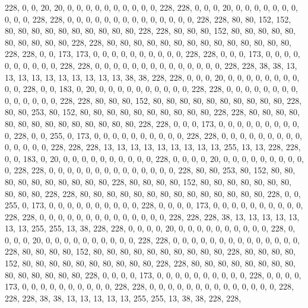 {	228, 0,   0,   20,  20,  0,   0,   0,   0,   0,   0,   0,   0,   0,   0,   228, 228, 0,   0,   0,   20,  0,   0,   0,   0,   0,   0,   0,   0,   0,   0,   228, 228, 0,   0,   0,   0,   0,   0,   0,   0,   0,   0,   0,   0,   0,   0,   228, 228, 80,  80,  152, 152, 80,  80,  80,  80,  80,  80,  80,  80,  80,  80,  228, 228, 80,  80,  80,  152, 80,  80,  80,  80,  80,  80,  80,  80,  80,  80,  228, 228, 80,  80,  80,  80,  80,  80,  80,  80,  80,  80,  80,  80,  80,  80,  228, 228, 0,   0,   173, 173, 0,   0,   0,   0,   0,   0,   0,   0,   0,   0,   228, 228, 0,   0,   0,   173, 0,   0,   0,   0,   0,   0,   0,   0,   0,   0,   228, 228, 0,   0,   0,   0,   0,   0,   0,   0,   0,   0,   0,   0,   0,   0,   228, 228, 38,  38,  13,  13,  13,  13,  13,  13,  13,  13,  13,  13,  38,  38,  228, 
	228, 0,   0,   0,   20,  0,   0,   0,   0,   0,   0,   0,   0,   0,   0,   228, 0,   0,   183, 0,   20,  0,   0,   0,   0,   0,   0,   0,   0,   0,   0,   228, 228, 0,   0,   0,   0,   0,   0,   0,   0,   0,   0,   0,   0,   0,   0,   228, 228, 80,  80,  80,  152, 80,  80,  80,  80,  80,  80,  80,  80,  80,  80,  228, 80,  80,  253, 80,  152, 80,  80,  80,  80,  80,  80,  80,  80,  80,  80,  228, 228, 80,  80,  80,  80,  80,  80,  80,  80,  80,  80,  80,  80,  80,  80,  228, 228, 0,   0,   0,   173, 0,   0,   0,   0,   0,   0,   0,   0,   0,   0,   228, 0,   0,   255, 0,   173, 0,   0,   0,   0,   0,   0,   0,   0,   0,   0,   228, 228, 0,   0,   0,   0,   0,   0,   0,   0,   0,   0,   0,   0,   0,   0,   228, 228, 228, 13,  13,  13,  13,  13,  13,  13,  13,  13,  255, 13,  13,  228, 228, 
	0,   0,   183, 0,   20,  0,   0,   0,   0,   0,   0,   0,   0,   0,   0,   228, 0,   0,   0,   0,   20,  0,   0,   0,   0,   0,   0,   0,   0,   0,   0,   228, 228, 0,   0,   0,   0,   0,   0,   0,   0,   0,   0,   0,   0,   0,   0,   228, 80,  80,  253, 80,  152, 80,  80,  80,  80,  80,  80,  80,  80,  80,  80,  228, 80,  80,  80,  80,  152, 80,  80,  80,  80,  80,  80,  80,  80,  80,  80,  228, 228, 80,  80,  80,  80,  80,  80,  80,  80,  80,  80,  80,  80,  80,  80,  228, 0,   0,   255, 0,   173, 0,   0,   0,   0,   0,   0,   0,   0,   0,   0,   228, 0,   0,   0,   0,   173, 0,   0,   0,   0,   0,   0,   0,   0,   0,   0,   228, 228, 0,   0,   0,   0,   0,   0,   0,   0,   0,   0,   0,   0,   0,   0,   228, 228, 228, 38,  13,  13,  13,  13,  13,  13,  13,  255, 255, 13,  38,  228, 228, 
	0,   0,   0,   0,   20,  0,   0,   0,   0,   0,   0,   0,   0,   0,   0,   228, 0,   0,   0,   0,   20,  0,   0,   0,   0,   0,   0,   0,   0,   0,   0,   228, 228, 0,   0,   0,   0,   0,   0,   0,   0,   0,   0,   0,   0,   0,   0,   228, 80,  80,  80,  80,  152, 80,  80,  80,  80,  80,  80,  80,  80,  80,  80,  228, 80,  80,  80,  80,  152, 80,  80,  80,  80,  80,  80,  80,  80,  80,  80,  228, 228, 80,  80,  80,  80,  80,  80,  80,  80,  80,  80,  80,  80,  80,  80,  228, 0,   0,   0,   0,   173, 0,   0,   0,   0,   0,   0,   0,   0,   0,   0,   228, 0,   0,   0,   0,   173, 0,   0,   0,   0,   0,   0,   0,   0,   0,   0,   228, 228, 0,   0,   0,   0,   0,   0,   0,   0,   0,   0,   0,   0,   0,   0,   228, 228, 228, 38,  38,  13,  13,  13,  13,  13,  255, 255, 13,  38,  38,  228, 228, 
}

